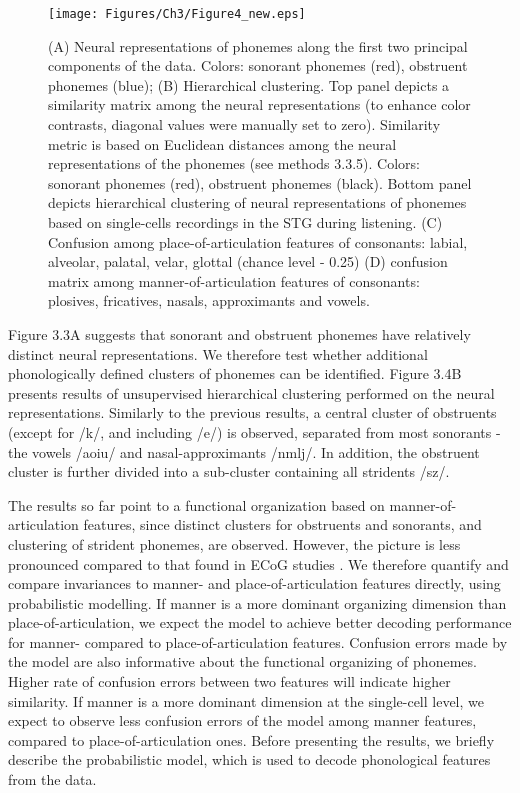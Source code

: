 \begin{figure}[h]
\vspace{.3in}
\texttt{[image: Figures/Ch3/Figure4\_new.eps]}
\caption{(A) Neural representations of phonemes along the first two principal components of the data. Colors: sonorant phonemes (red), obstruent phonemes (blue); (B) Hierarchical clustering. Top panel depicts a similarity matrix among the neural representations (to enhance color contrasts, diagonal values were manually set to zero). Similarity metric is based on Euclidean distances among the neural representations of the phonemes (see methods 3.3.5). Colors: sonorant phonemes (red), obstruent phonemes (black). Bottom panel depicts hierarchical clustering of neural representations of phonemes based on single-cells recordings in the STG during listening. (C) Confusion among place-of-articulation features of consonants: labial, alveolar, palatal, velar, glottal (chance level - 0.25) (D) confusion matrix among manner-of-articulation features of consonants: plosives, fricatives, nasals, approximants and vowels.}
\end{figure}

Figure 3.3A suggests that sonorant and obstruent phonemes have relatively distinct neural representations. We therefore test whether additional phonologically defined clusters of phonemes can be identified. Figure 3.4B presents results of unsupervised hierarchical clustering performed on the neural representations. Similarly to the previous results, a central cluster of obstruents (except for /k/, and including /e/) is observed, separated from most sonorants - the vowels /aoiu/ and nasal-approximants /nmlj/. In addition, the obstruent cluster is further divided into a sub-cluster containing all stridents /sz/. 

The results so far point to a functional organization based on manner-of-articulation features, since distinct clusters for obstruents and sonorants, and clustering of strident phonemes, are observed. However, the picture is less pronounced compared to that found in ECoG studies \citep{Mesgarani2014}. We therefore quantify and compare invariances to manner- and place-of-articulation features directly, using probabilistic modelling. If manner is a more dominant organizing dimension than place-of-articulation, we expect the model to achieve better decoding performance for manner- compared to place-of-articulation features. Confusion errors made by the model are also informative about the functional organizing of phonemes. Higher rate of confusion errors between two features will indicate higher similarity. If manner is a more dominant dimension at the single-cell level, we expect to observe less confusion errors of the model among manner features, compared to place-of-articulation ones. Before presenting the results, we briefly describe the probabilistic model, which is used to decode phonological features from the data.

